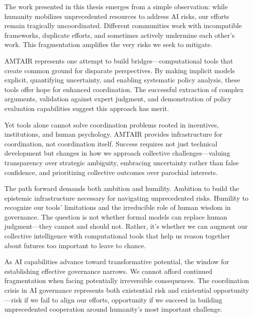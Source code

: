 \documentclass[
  11pt,
  letterpaper,
]{book}
\begin{document}

The work presented in this thesis emerges from a simple observation:
while humanity mobilizes unprecedented resources to address AI risks,
our efforts remain tragically uncoordinated. Different communities work
with incompatible frameworks, duplicate efforts, and sometimes actively
undermine each other's work. This fragmentation amplifies the very risks
we seek to mitigate.

AMTAIR represents one attempt to build bridges---computational tools
that create common ground for disparate perspectives. By making implicit
models explicit, quantifying uncertainty, and enabling systematic policy
analysis, these tools offer hope for enhanced coordination. The
successful extraction of complex arguments, validation against expert
judgment, and demonstration of policy evaluation capabilities suggest
this approach has merit.

Yet tools alone cannot solve coordination problems rooted in incentives,
institutions, and human psychology. AMTAIR provides infrastructure for
coordination, not coordination itself. Success requires not just
technical development but changes in how we approach collective
challenges---valuing transparency over strategic ambiguity, embracing
uncertainty rather than false confidence, and prioritizing collective
outcomes over parochial interests.

The path forward demands both ambition and humility. Ambition to build
the epistemic infrastructure necessary for navigating unprecedented
risks. Humility to recognize our tools' limitations and the irreducible
role of human wisdom in governance. The question is not whether formal
models can replace human judgment---they cannot and should not. Rather,
it's whether we can augment our collective intelligence with
computational tools that help us reason together about futures too
important to leave to chance.

\begin{tcolorbox}[enhanced jigsaw, opacityback=0, leftrule=.75mm, breakable, coltitle=black, colbacktitle=quarto-callout-important-color!10!white, bottomrule=.15mm, rightrule=.15mm, toprule=.15mm, left=2mm, bottomtitle=1mm, arc=.35mm, toptitle=1mm, titlerule=0mm, title=\textcolor{quarto-callout-important-color}{\faExclamation}\hspace{0.5em}{The Stakes}, opacitybacktitle=0.6, colframe=quarto-callout-important-color-frame, colback=white]

As AI capabilities advance toward transformative potential, the window
for establishing effective governance narrows. We cannot afford
continued fragmentation when facing potentially irreversible
consequences. The coordination crisis in AI governance represents both
existential risk and existential opportunity---risk if we fail to align
our efforts, opportunity if we succeed in building unprecedented
cooperation around humanity's most important challenge.

\end{tcolorbox}
\end{document}
